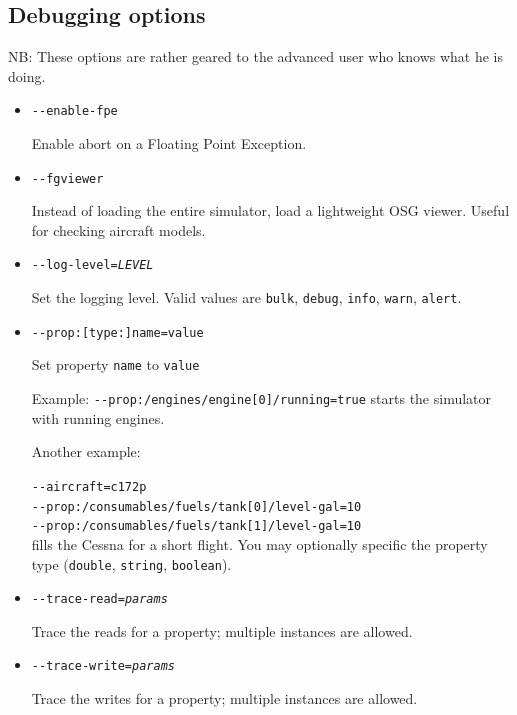 {

  \subsection{Debugging options}

  NB: These options are rather geared to the advanced user who knows what he is doing.

  \begin{itemize}

  \item{\texttt{-$ $-enable-fpe}}

  Enable abort on a Floating Point Exception.

  \item{\texttt{-$ $-fgviewer}}

  Instead of loading the entire simulator, load a lightweight OSG viewer. Useful for checking aircraft
  models.

  \item{\texttt{-$ $-log-level={\it LEVEL}}}

  Set the logging level. Valid values are \texttt{bulk}, \texttt{debug}, \texttt{info}, \texttt{warn}, \texttt{alert}.

  \item{\texttt{-$ $-prop:[type:]name=value}}

  Set property \texttt{name} to \texttt{value}

  Example: \texttt{-$ $-prop:/engines/engine[0]/running=true} starts the simulator with running engines.

  Another example:

  \texttt{-$ $-aircraft=c172p}\\
  \texttt{-$ $-prop:/consumables/fuels/tank[0]/level-gal=10}\\
  \texttt{-$ $-prop:/consumables/fuels/tank[1]/level-gal=10}\\

  fills the Cessna for a short flight. You may optionally specific
  the property type (\texttt{double}, \texttt{string}, \texttt{boolean}).

  \item{\texttt{-$ $-trace-read={\it params}}}

  Trace the reads for a property; multiple instances are allowed.

  \item{\texttt{-$ $-trace-write={\it params}}}

  Trace the writes for a property; multiple instances are allowed.
  \end{itemize}
}

